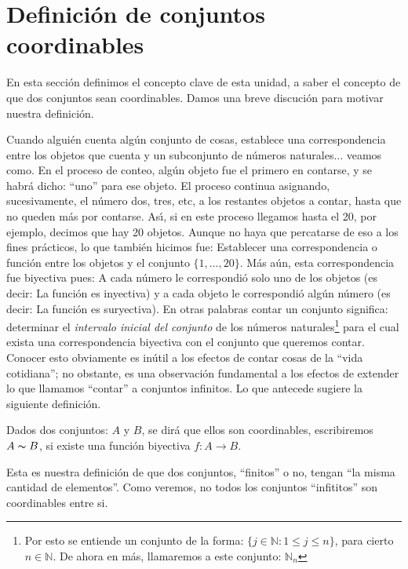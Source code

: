 

\section{Definici\'on de conjuntos coordinables}
En esta secci\'on definimos el concepto clave de esta unidad, a
saber el concepto de que dos conjuntos sean coordinables. Damos
una breve discuci\'on para motivar nuestra definici\'on.

 Cuando
algui\'en cuenta alg\'un conjunto de cosas, establece una
correspondencia entre los objetos que cuenta y un subconjunto de
n\'umeros naturales... veamos como. En el proceso de conteo,
alg\'un objeto fue el primero en contarse, y se habr\'a dicho:
``uno'' para ese objeto. El proceso continua asignando,
sucesivamente, el n\'umero dos, tres, etc, a los restantes objetos
a contar, hasta que no queden m\'as por contarse. As\'{\i}, si en
este proceso llegamos hasta el 20, por ejemplo, decimos que hay 20
objetos. Aunque no haya que percatarse de eso a los fines
pr\'acticos, lo que tambi\'en hicimos fue: Establecer una
correspondencia o funci\'on entre los objetos y el conjunto
$\{1,\dots,20\}$. M\'as a\'un, esta correspondencia fue biyectiva
pues: A cada n\'umero le correspondi\'o solo uno de los objetos
(es decir: La funci\'on es inyectiva) y a cada objeto le
correspondi\'o alg\'un n\'umero (es decir: La funci\'on es
suryectiva). En otras palabras contar un conjunto significa:
determinar el \emph{intervalo inicial del conjunto} de los
n\'umeros naturales\footnote{Por esto se entiende un conjunto de
la forma: $\{j\in\mathbb{N}:1\leq j\leq n\}$, para cierto
$n\in\mathbb{N}$. De ahora en m\'as, llamaremos a este conjunto:
$\mathbb{N}_n$} para el cual exista una correspondencia biyectiva
con el conjunto que queremos contar. Conocer esto obviamente es
in\'util a los efectos de contar cosas de la ``vida cotidiana'';
no obstante, es una observaci\'on fundamental a los efectos de
extender lo que llamamos ``contar'' a conjuntos infinitos. Lo que
antecede sugiere la siguiente definici\'on.

\begin{definicion}\label{defcoordinables} Dados dos conjuntos: $A$ y $B$,
se dir\'a que ellos son coordinables, escribiremos $A\thicksim B$,
si existe una funci\'on biyectiva $f:A\longrightarrow B$.
\end{definicion}

Esta es nuestra definici\'on de que dos conjuntos, ``finitos'' o
no, tengan ``la misma cantidad de elementos''. Como veremos, no
todos los  conjuntos ``infititos'' son coordinables entre si.

